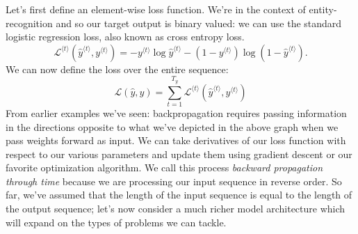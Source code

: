 \documentclass[12pt]{article}
\begin{document}
Let's first define an element-wise loss function. We're in the context of entity-recognition and so our target output is binary valued: we can use the standard logistic regression loss, also known as cross entropy loss.
\[
\mathcal L^{\langle t \rangle} \left( \hat y^{\langle t \rangle}, y^{\langle t \rangle}\right) = -y^{\langle t \rangle} \log \hat y^{\langle t \rangle} - (1-y^{\langle t \rangle}) \log (1 - \hat y^{\langle t \rangle}).
\]
We can now define the loss over the entire sequence:
\[
\mathcal L(\hat y, y) = \sum_{t=1}^{T_y} \mathcal L^{\langle t \rangle} \left( \hat y^{\langle t \rangle}, y^{\langle t \rangle}\right)
\]
From earlier examples we've seen: backpropagation requires passing information in the directions opposite to what we've depicted in the above graph when we pass weights forward as input. We can take derivatives of our loss function with respect to our various parameters and update them using gradient descent or our favorite optimization algorithm. We call this process \emph{backward propagation   through time} because we are processing our input sequence in reverse order.
So far, we've assumed that the length of the input sequence is equal to the length of the output sequence; let's now consider a much richer model architecture which will expand on the types of problems we can tackle.
\end{document}

